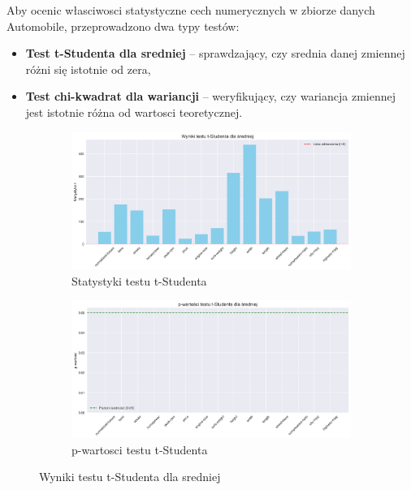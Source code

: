 \documentclass[12pt,a4paper]{article}
\begin{document}
Aby ocenic własciwosci statystyczne cech numerycznych w zbiorze danych Automobile, przeprowadzono dwa typy testów:
\begin{itemize}
    \item \textbf{Test t-Studenta dla sredniej} – sprawdzający, czy srednia danej zmiennej różni się istotnie od zera,
    \item \textbf{Test chi-kwadrat dla wariancji} – weryfikujący, czy wariancja zmiennej jest istotnie różna od wartosci teoretycznej.
\end{itemize}

\begin{figure}[H]
    \centering
    \begin{subfigure}[b]{0.48\textwidth}
        \includegraphics[width=\textwidth]{figures/ttest_statistics.png}
        \caption{Statystyki testu t-Studenta}
    \end{subfigure}
    \hfill
    \begin{subfigure}[b]{0.48\textwidth}
        \includegraphics[width=\textwidth]{figures/ttest_pvalues.png}
        \caption{p-wartosci testu t-Studenta}
    \end{subfigure}
    \caption{Wyniki testu t-Studenta dla sredniej}
    \label{fig:ttest_results}
\end{figure}
\end{document}
